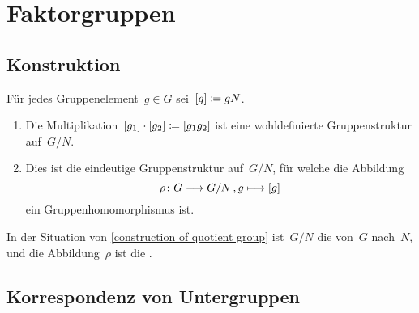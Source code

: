 \section{Faktorgruppen}



\subsection{Konstruktion}

\begin{proposition}
  \label{construction of quotient group}
  Für jedes Gruppenelement~$g \in G$ sei~$[g] \coloneqq gN$.
  \begin{enumerate}
    \item
      Die Multiplikation~$[g_1] \cdot [g_2] \coloneqq [g_1 g_2]$ ist eine wohldefinierte Gruppenstruktur auf~$G/N$.
    \item
      Dies ist die eindeutige Gruppenstruktur auf~$G/N$, für welche die Abbildung
      \[
        \rho
        \colon
        G \to G/N \,,
        g \mapsto \class{g}
      \] ein Gruppenhomomorphismus ist.
  \end{enumerate}
\end{proposition}

\begin{definition}
  In der Situation von \cref{construction of quotient group} ist~$G/N$ die  von~$G$ nach~$N$, und die Abbildung~$\rho$ ist die .
\end{definition}



\subsection{Korrespondenz von Untergruppen}

